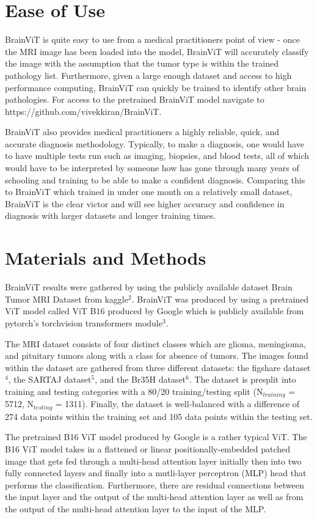 \documentclass[conference]{IEEEtran}
\begin{document}
\section{Ease of Use}

BrainViT is quite easy to use from a medical practitioners point of view - once the MRI image has been loaded into the model, BrainViT will accurately classify the image with the assumption that the tumor type is within the trained pathology list. Furthermore, given a large enough dataset and access to high performance computing, BrainViT can quickly be trained to identify other brain pathologies. For access to the pretrained BrainViT model navigate to https://github.com/vivekkiran/BrainViT.

BrainViT also provides medical practitioners a highly reliable, quick, and accurate diagnosis methodology. Typically, to make a diagnosis, one would have to have multiple tests run such as imaging, biopsies, and blood tests, all of which would have to be interpreted by someone how has gone through many years of schooling and training to be able to make a confident diagnosis. Comparing this to BrainViT which trained in under one month on a relatively small dataset, BrainViT is the clear victor and will see higher accuracy and confidence in diagnosis with larger datasets and longer training times.

\section{Materials and Methods}
BrainViT results were gathered by using the publicly available dataset Brain Tumor MRI Dataset from kaggle$^2$. BrainViT was produced by using a pretrained ViT model called ViT B16 produced by Google which is publicly available from pytorch's torchvision transformers module$^3$.

The MRI dataset consists of four distinct classes which are glioma, meningioma, and pituitary tumors along with a class for absence of tumors. The images found within the dataset are gathered from three different datasets: the figshare dataset$^4$, the SARTAJ dataset$^5$, and the Br35H dataset$^6$. The dataset is presplit into training and testing categories with a 80/20 training/testing split (N$_{training}$ = 5712, N$_{testing}$ = 1311). Finally, the dataset is well-balanced with a difference of 274 data points within the training set and 105 data points within the testing set. 

The pretrained B16 ViT model produced by Google is a rather typical ViT. The B16 ViT model takes in a flattened or linear positionally-embedded patched image that gets fed through a multi-head attention layer initially then into two fully connected layers and finally into a mutli-layer perceptron (MLP) head that performs the classification. Furthermore, there are residual connections between the input layer and the output of the multi-head attention layer as well as from the output of the multi-head attention layer to the input of the MLP.
\end{document}
